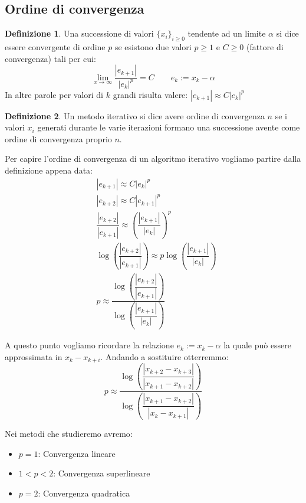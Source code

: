 \documentclass[12pt, a4paper]{book}
\theoremstyle{definition}
\newtheorem{defn}{Definizione}[section]
\begin{document}
\subsection{Ordine di convergenza}
\begin{flushleft}

\begin{defn}
	Una successione di valori $\{x_{i}\}_{i \geq 0}$ tendente ad un limite $\alpha$ si dice essere convergente di ordine $p$ se esistono due valori $p \geq 1$ e $C \geq 0$ (fattore di convergenza) tali per cui: 
	\[
		\lim_{x \to \infty} \dfrac{|e_{k+1}|}{|e_{k}|^{p}} = C \quad \quad e_{k}:= x_{k} - \alpha
	\]	
	In altre parole per valori di $k$ grandi risulta valere: $|e_{k+1}| \approx C|e_{k}|^{p}$
\end{defn}

\begin{defn}
	Un metodo iterativo si dice avere ordine di convergenza $n$ se i valori $x_{i}$ generati durante le varie iterazioni formano una successione avente come ordine di convergenza proprio $n$. 
\end{defn}

Per capire l'ordine di convergenza di un algoritmo iterativo vogliamo partire dalla definizione appena data:
\begin{equation}
	\begin{split}
		& |e_{k+1}| \approx C|e_{k}|^{p} \\
		& |e_{k+2}| \approx C|e_{k+1}|^{p} \\
		& \dfrac{|e_{k+2}|}{|e_{k+1}|} \approx \left( \dfrac{|e_{k+1}|}{|e_{k}|} \right) ^ {p} \\
		& \log \left( \dfrac{|e_{k+2}|}{|e_{k+1}|} \right) \approx p \log  \left( \dfrac{|e_{k+1}|}{|e_{k}|} \right) \\
		& p \approx \dfrac{\log \left( \dfrac{|e_{k+2}|}{|e_{k+1}|} \right)}{\log  \left( \dfrac{|e_{k+1}|}{|e_{k}|} \right)}
	\end{split}
\end{equation}

A questo punto vogliamo ricordare la relazione $e_{k}:= x_{k} - \alpha$ la quale può essere approssimata in $x_{k} - x_{k+i}$. Andando a sostituire otterremmo: 
\[ 
	p \approx \dfrac{\log \left( \dfrac{|x_{k+2} - x_{k+3} |}{|x_{k+1} - x_{k+2}|} \right)}{\log  \left( \dfrac{|x_{k+1} - x_{k+2}|}{|x_{k} -x_{k+1}|} \right)}
\]

Nei metodi che studieremo avremo:
\begin{itemize}
	\item $p = 1$: Convergenza lineare
	\item $ 1 < p < 2$: Convergenza superlineare
	\item $p = 2$: Convergenza quadratica
\end{itemize}


\end{flushleft}
\end{document}
